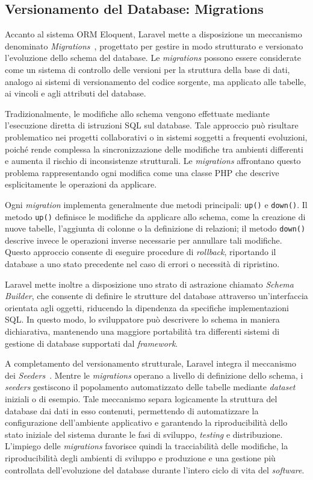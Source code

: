 \subsection{Versionamento del Database: Migrations}
Accanto al sistema ORM Eloquent, Laravel mette a disposizione un meccanismo denominato \textit{Migrations}~\autocite{DatabaseMigrationsLaravel}, progettato per gestire in modo strutturato e versionato l'evoluzione dello schema del database. Le \textit{migrations} possono essere considerate come un sistema di controllo delle versioni per la struttura della base di dati, analogo ai sistemi di versionamento del codice sorgente, ma applicato alle tabelle, ai vincoli e agli attributi del database.

Tradizionalmente, le modifiche allo schema vengono effettuate mediante l'esecuzione diretta di istruzioni SQL sul database. Tale approccio può risultare problematico nei progetti collaborativi o in sistemi soggetti a frequenti evoluzioni, poiché rende complessa la sincronizzazione delle modifiche tra ambienti differenti e aumenta il rischio di inconsistenze strutturali. Le \textit{migrations} affrontano questo problema rappresentando ogni modifica come una classe PHP che descrive esplicitamente le operazioni da applicare.

Ogni \textit{migration} implementa generalmente due metodi principali: \texttt{up()} e \texttt{down()}. Il metodo \texttt{up()} definisce le modifiche da applicare allo schema, come la creazione di nuove tabelle, l'aggiunta di colonne o la definizione di relazioni; il metodo \texttt{down()} descrive invece le operazioni inverse necessarie per annullare tali modifiche. Questo approccio consente di eseguire procedure di \textit{rollback}, riportando il database a uno stato precedente nel caso di errori o necessità di ripristino.

Laravel mette inoltre a disposizione uno strato di astrazione chiamato \textit{Schema Builder}, che consente di definire le strutture del database attraverso un'interfaccia orientata agli oggetti, riducendo la dipendenza da specifiche implementazioni SQL. In questo modo, lo sviluppatore può descrivere lo schema in maniera dichiarativa, mantenendo una maggiore portabilità tra differenti sistemi di gestione di database supportati dal \textit{framework}.

A completamento del versionamento strutturale, Laravel integra il meccanismo dei \textit{Seeders}~\autocite{DatabaseSeedingLaravel}. Mentre le \textit{migrations} operano a livello di definizione dello schema, i \textit{seeders} gestiscono il popolamento automatizzato delle tabelle mediante \textit{dataset} iniziali o di esempio. Tale meccanismo separa logicamente la struttura del database dai dati in esso contenuti, permettendo di automatizzare la configurazione dell'ambiente applicativo e garantendo la riproducibilità dello stato iniziale del sistema durante le fasi di sviluppo, \textit{testing} e distribuzione. L'impiego delle \textit{migrations} favorisce quindi la tracciabilità delle modifiche, la riproducibilità degli ambienti di sviluppo e produzione e una gestione più controllata dell'evoluzione del database durante l'intero ciclo di vita del \textit{software}.
